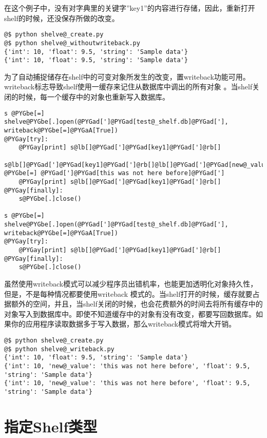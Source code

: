 \documentclass[a4paper,10pt,english]{manual}
\begin{document}
在这个例子中，没有对字典里的关键字''key1''的内容进行存储，因此，重新打开shelf的时候，还没保存所做的改变。

\begin{Verbatim}[commandchars=@\[\]]
@$ python shelve@_create.py
@$ python shelve@_withoutwriteback.py
{'int': 10, 'float': 9.5, 'string': 'Sample data'}
{'int': 10, 'float': 9.5, 'string': 'Sample data'}
\end{Verbatim}

为了自动捕捉储存在shelf中的可变对象所发生的改变，置writeback功能可用。writeback标志导致shelf使用一缓存来记住从数据库中调出的所有对象 。当shelf关闭的时候，每一个缓存中的对象也重新写入数据库。

\begin{Verbatim}[commandchars=@\[\]]
s @PYGbe[=] shelve@PYGbe[.]open(@PYGad[']@PYGad[test@_shelf.db]@PYGad['], writeback@PYGbe[=]@PYGaA[True])
@PYGay[try]:
    @PYGay[print] s@lb[]@PYGad[']@PYGad[key1]@PYGad[']@rb[]
    s@lb[]@PYGad[']@PYGad[key1]@PYGad[']@rb[]@lb[]@PYGad[']@PYGad[new@_value]@PYGad[']@rb[] @PYGbe[=] @PYGad[']@PYGad[this was not here before]@PYGad[']
    @PYGay[print] s@lb[]@PYGad[']@PYGad[key1]@PYGad[']@rb[]
@PYGay[finally]:
    s@PYGbe[.]close()

s @PYGbe[=] shelve@PYGbe[.]open(@PYGad[']@PYGad[test@_shelf.db]@PYGad['], writeback@PYGbe[=]@PYGaA[True])
@PYGay[try]:
    @PYGay[print] s@lb[]@PYGad[']@PYGad[key1]@PYGad[']@rb[]
@PYGay[finally]:
    s@PYGbe[.]close()
\end{Verbatim}

虽然使用writeback模式可以减少程序员出错机率，也能更加透明化对象持久性，但是，不是每种情况都要使用writeback 模式的。当shelf打开的时候，缓存就要占据额外的空间，并且，当shelf关闭的时候，也会花费额外的时间去将所有缓存中的对象写入到数据库中。即使不知道缓存中的对象有没有改变，都要写回数据库。如果你的应用程序读取数据多于写入数据，那么writeback模式将增大开销。

\begin{Verbatim}[commandchars=@\[\]]
@$ python shelve@_create.py
@$ python shelve@_writeback.py
{'int': 10, 'float': 9.5, 'string': 'Sample data'}
{'int': 10, 'new@_value': 'this was not here before', 'float': 9.5, 'string': 'Sample data'}
{'int': 10, 'new@_value': 'this was not here before', 'float': 9.5, 'string': 'Sample data'}
\end{Verbatim}


\section{指定Shelf类型}
\end{document}
